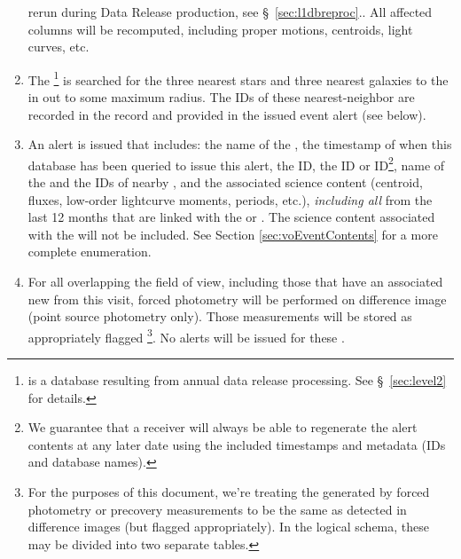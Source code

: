 \documentclass[SE,lsstdraft,toc]{lsstdoc}
\begin{document}
\begin{enumerate}
{rerun during Data Release production, see \S~\ref{sec:l1dbreproc}.}. All affected columns will be recomputed, including proper motions, centroids, light curves, etc.
\item The \DR\footnote{\DR is a database resulting from annual data release processing. See \S~\ref{sec:level2} for details.} is searched for the three nearest stars and three nearest galaxies to the \DIAObject in \Objects{} out to some maximum radius. The IDs of these nearest-neighbor \Objects are recorded in the \DIAObject record and provided in the issued
event alert (see below).
\item An alert is issued that includes: the name of the \DB, the timestamp of when this database has been queried to issue this alert, the \DIASource ID, the \SSObject ID or \DIAObject ID\footnote{We guarantee that a receiver will always be able to regenerate the alert contents at any later date using the included timestamps and metadata (IDs and database names).}, name of the \DR and the IDs of nearby \Objects, and the associated science content (centroid, fluxes, low-order lightcurve moments, periods, etc.), \emph{including all} \DIASources from the last 12 months that are linked with the \SSObject or \DIAObject. The science content associated with the \DR \Objects will not be included. See Section \ref{sec:voEventContents} for a more complete enumeration.
\item For all \DIAObjects overlapping the field of view, including those that have an associated
new \DIASource from this visit, forced photometry will be performed on difference image (point source photometry only). Those measurements will be stored as appropriately flagged \DIASources\footnote{For the purposes of this document, we're treating the \DIASources generated by forced photometry or precovery measurements to be the same as \DIASources detected in difference images (but flagged appropriately). In the logical schema, these may be divided into two separate tables.}.  No alerts will be issued for these \DIASources.

\end{enumerate}
\end{document}
